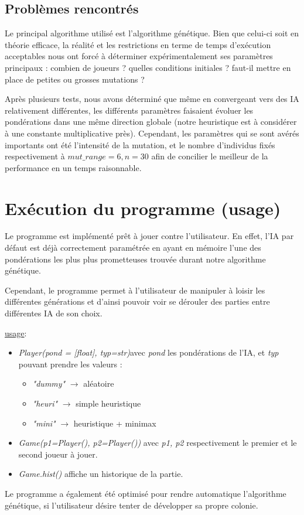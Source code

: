 \documentclass[10pt, french]{article}
\begin{document}
\subsection{Problèmes rencontrés}
Le principal algorithme utilisé est l'algorithme génétique. Bien que celui-ci soit en théorie efficace, la réalité et les restrictions en terme de temps d'exécution acceptables nous ont forcé à déterminer expérimentalement ses paramètres principaux : combien de joueurs ? quelles conditions initiales ? faut-il mettre en place de petites ou grosses mutations ?
\par Après plusieurs tests, nous avons déterminé que même en convergeant vers des IA relativement différentes, les différents paramètres faisaient évoluer les pondérations dans une même direction globale (notre heuristique est à considérer à une constante multiplicative près). Cependant, les paramètres qui se sont avérés importants ont été l'intensité de la mutation, et le nombre d'individus fixés respectivement à $mut\_range =6, n=30$ afin de concilier le meilleur de la performance en un temps raisonnable.
\section{Exécution du programme (usage)}
Le programme est implémenté prêt à jouer contre l'utilisateur. En effet, l'IA par défaut est déjà correctement paramétrée en ayant en mémoire l'une des pondérations les plus plus prometteuses trouvée durant notre algorithme génétique.
\par Cependant, le programme permet à l'utilisateur de manipuler à loisir les différentes générations et d'ainsi pouvoir voir se dérouler des parties entre différentes IA de son choix.
\par \underline{usage}:
\begin{itemize}
\item \textit{Player(pond = [float], typ=str)}\quad avec \emph{pond} les pondérations de l'IA, et \emph{typ} pouvant prendre les valeurs :
\begin{itemize}\item \emph{"dummy"} $\rightarrow$ aléatoire
\item \emph{"heuri"} $\rightarrow$ simple heuristique
\item \emph{"mini"} $\rightarrow$ heuristique + minimax
\end{itemize}
\item \textit{Game(p1=Player(), p2=Player())} \quad avec \emph{p1, p2} respectivement le premier et le second joueur à jouer.
\item \textit{Game.hist()} \quad affiche un historique de la partie.
\end{itemize}
Le programme a également été optimisé pour rendre automatique l'algorithme génétique, si l'utilisateur désire tenter de développer sa propre colonie.
\end{document}
